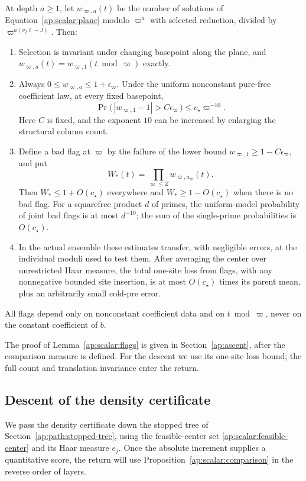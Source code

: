 \begin{lemma}
At depth $a\ge1$, let $w_{\varpi,a}(t)$ be the number of solutions of
Equation~\eqref{ap:scalar:plane} modulo $\varpi^a$ with selected
reduction, divided by $\varpi^{a(v_f\ell-J)}$. Then:
\begin{enumerate}
\item Selection is invariant under changing basepoint along the plane,
and $w_{\varpi,a}(t)=w_{\varpi,1}(t\bmod\varpi)$ exactly.
\item Always $0\le w_{\varpi,a}\le1+\epsilon_\varpi$. Under the uniform
nonconstant pure-free coefficient law, at every fixed basepoint,
\[
 \Pr\bigl(\,|w_{\varpi,1}-1|>C\epsilon_\varpi\,\bigr)
                  \le c_\star\varpi^{-10}.
\]
Here $C$ is fixed, and the exponent $10$ can be increased by enlarging
the structural column count.
\item Define a bad flag at $\varpi$ by the failure of the lower bound
$w_{\varpi,1}\ge1-C\epsilon_\varpi$, and put
\begin{equation}\label{ap:scalar:selected-weight}
 W_*(t)=\prod_{\varpi\le Z}w_{\varpi,a_\varpi}(t).
\end{equation}
Then $W_*\le1+O(c_\star)$ everywhere and $W_*\ge1-O(c_\star)$ when
there is no bad flag. For a squarefree product $d$ of primes, the
uniform-model probability of joint bad flags is at most $d^{-10}$;
the sum of the single-prime probabilities is $O(c_\star)$.
\item In the actual ensemble these estimates transfer, with negligible
errors, at the individual moduli used to test them. After averaging
the center over unrestricted Haar measure, the total one-site loss
from flags, with any nonnegative bounded site insertion, is at most
$O(c_\star)$ times its parent mean, plus an arbitrarily small
cold-pre error.
\end{enumerate}
All flags depend only on nonconstant coefficient data and on
$t\bmod\varpi$, never on the constant coefficient of $b$.
\end{lemma}

The proof of Lemma~\ref{ap:scalar:flags} is given in
Section~\ref{ap:ascent}, after the comparison measure is defined.  For the descent we use its one-site loss bound;
the full count and translation invariance enter the return.

\subsection{Descent of the density certificate}

We pass the density certificate down the stopped tree of
Section~\ref{ap:path:stopped-tree}, using the feasible-center set
\eqref{ap:scalar:feasible-center} and its Haar measure $e_j$.
Once the absolute increment supplies a quantitative score, the
return will use Proposition~\ref{ap:scalar:comparison} in the reverse
order of layers.

